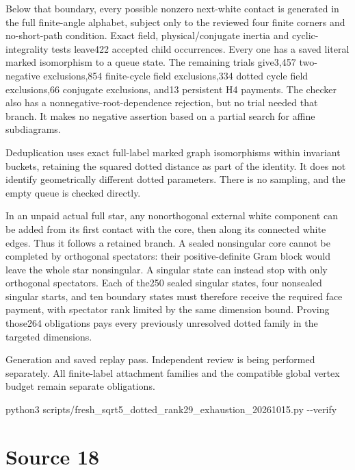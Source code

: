\documentclass[
  10pt,
]{report}
\newenvironment{Shaded}{}{}
\newcommand{\AttributeTok}[1]{\textcolor[rgb]{0.49,0.56,0.16}{#1}}
\newcommand{\ExtensionTok}[1]{#1}
\newcommand{\NormalTok}[1]{#1}
\begin{document}
Below that boundary, every possible nonzero next-white contact is
generated in the full finite-angle alphabet, subject only to the
reviewed four finite corners and no-short-path condition. Exact field,
physical/conjugate inertia and cyclic-integrality tests leave422
accepted child occurrences. Every one has a saved literal marked
isomorphism to a queue state. The remaining trials give3,457
two-negative exclusions,854 finite-cycle field exclusions,334 dotted
cycle field exclusions,66 conjugate exclusions, and13 persistent H4
payments. The checker also has a nonnegative-root-dependence rejection,
but no trial needed that branch. It makes no negative assertion based on
a partial search for affine subdiagrams.

Deduplication uses exact full-label marked graph isomorphisms within
invariant buckets, retaining the squared dotted distance as part of the
identity. It does not identify geometrically different dotted
parameters. There is no sampling, and the empty queue is checked
directly.

In an unpaid actual full star, any nonorthogonal external white
component can be added from its first contact with the core, then along
its connected white edges. Thus it follows a retained branch. A sealed
nonsingular core cannot be completed by orthogonal spectators: their
positive-definite Gram block would leave the whole star nonsingular. A
singular state can instead stop with only orthogonal spectators. Each of
the250 sealed singular states, four nonsealed singular starts, and ten
boundary states must therefore receive the required face payment, with
spectator rank limited by the same dimension bound. Proving those264
obligations pays every previously unresolved dotted family in the
targeted dimensions.

Generation and saved replay pass. Independent review is being performed
separately. All finite-label attachment families and the compatible
global vertex budget remain separate obligations.

\begin{Shaded}
\begin{Highlighting}[]
\ExtensionTok{python3}\NormalTok{ scripts/fresh\_sqrt5\_dotted\_rank29\_exhaustion\_20261015.py }\AttributeTok{{-}{-}verify}
\end{Highlighting}
\end{Shaded}

\clearpage

\chapter{Source 18}\label{source-18}
\end{document}
